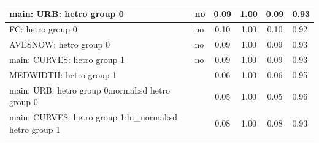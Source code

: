\begin{table}
\begin{center}
\begin{tabular}{|l|l|c|c|c|l|}
			\hline
			main: URB: hetro group 0 & no & 0.09 & 1.00 & 0.09 & 0.93 \\
			\hline
			FC: hetro group 0 & no & 0.10 & 1.00 & 0.10 & 0.92 \\
			\hline
			AVESNOW: hetro group 0 & no & 0.09 & 1.00 & 0.09 & 0.93 \\
			\hline
			main: CURVES: hetro group 1 & no & 0.09 & 1.00 & 0.09 & 0.93 \\
			\hline
			MEDWIDTH: hetro group 1 &  & 0.06 & 1.00 & 0.06 & 0.95 \\
			\hline
			main: URB: hetro group 0:normal:sd  hetro group 0 &  & 0.05 & 1.00 & 0.05 & 0.96 \\
			\hline
			main: CURVES: hetro group 1:ln_normal:sd  hetro group 1 &  & 0.08 & 1.00 & 0.08 & 0.93 \\
			\hline
		\end{tabular}
	\end{center}
\end{table}